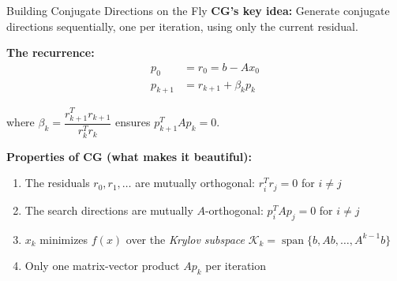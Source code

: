 \documentclass[aspectratio=169]{beamer}
\begin{document}
\begin{frame}{Building Conjugate Directions on the Fly}
    \textbf{CG's key idea:} Generate conjugate directions sequentially,
    one per iteration, using only the current residual.

    \vspace{0.2cm}
    \textbf{The recurrence:}
    \begin{align*}
        p_0 &= r_0 = b - A x_0 \\[0.2cm]
        p_{k+1} &= r_{k+1} + \beta_k p_k
    \end{align*}

    \vspace{0.15cm}
    where $\beta_k = \dfrac{r_{k+1}^T r_{k+1}}{r_k^T r_k}$ ensures $p_{k+1}^T A p_k = 0$.

    \pause
    \vspace{0.2cm}
    \textbf{Properties of CG (what makes it beautiful):}
    \begin{enumerate}
        \item The residuals $r_0, r_1, \ldots$ are mutually orthogonal: $r_i^T r_j = 0$ for $i \neq j$
        \item The search directions are mutually $A$-orthogonal: $p_i^T A p_j = 0$ for $i \neq j$
        \item $x_k$ minimizes $f(x)$ over the \emph{Krylov subspace}
              $\mathcal{K}_k = \operatorname{span}\{b, Ab, \ldots, A^{k-1}b\}$
        \item Only one matrix-vector product $A p_k$ per iteration
    \end{enumerate}
\end{frame}
\end{document}
